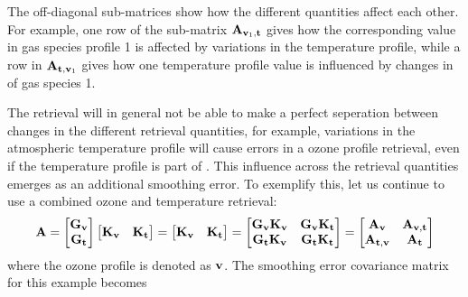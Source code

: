 The off-diagonal sub-matrices show how the different quantities affect each
other. For example, one row of the sub-matrix
$\mathbf{A}_{\mathbf{v}_1,\mathbf{t}}$ gives how the corresponding value in gas
species profile 1 is affected by variations in the temperature profile, while a
row in $\mathbf{A}_{\mathbf{t},\mathbf{v}_1}$ gives how one temperature profile
value is influenced by changes in of gas species 1.

The retrieval will in general not be able to make a perfect seperation between
changes in the different retrieval quantities, for example, variations in the
atmospheric temperature profile will cause errors in a ozone profile retrieval,
even if the temperature profile is part of \SttVct. This influence across the
retrieval quantities emerges as an additional smoothing error. To exemplify
this, let us continue to use a combined ozone and temperature retrieval:
\begin{displaymath}
  \mathbf{A}=  
  \begin{bmatrix}
    \mathbf{G}_{\mathbf{v}}\\\mathbf{G}_{\mathbf{t}}
  \end{bmatrix}
  \begin{bmatrix}
    \mathbf{K}_{\mathbf{v}} & \mathbf{K}_{\mathbf{t}}
  \end{bmatrix} =
  \begin{bmatrix}
    \mathbf{K}_{\mathbf{v}} & \mathbf{K}_{\mathbf{t}}
  \end{bmatrix} =
  \begin{bmatrix}
    \mathbf{G}_{\mathbf{v}}\mathbf{K}_{\mathbf{v}} &
    \mathbf{G}_{\mathbf{v}}\mathbf{K}_{\mathbf{t}} \\
    \mathbf{G}_{\mathbf{t}}\mathbf{K}_{\mathbf{v}} &
    \mathbf{G}_{\mathbf{t}}\mathbf{K}_{\mathbf{t}} \\
  \end{bmatrix} =
  \begin{bmatrix}
    \mathbf{A}_{\mathbf{v}} & \mathbf{A}_{\mathbf{v},\mathbf{t}} \\
    \mathbf{A}_{\mathbf{t},\mathbf{v}} & \mathbf{A}_{\mathbf{t}} 
  \end{bmatrix} 
\end{displaymath}
where the ozone profile is denoted as $\mathbf{v}$. The smoothing error
covariance matrix for this example becomes
